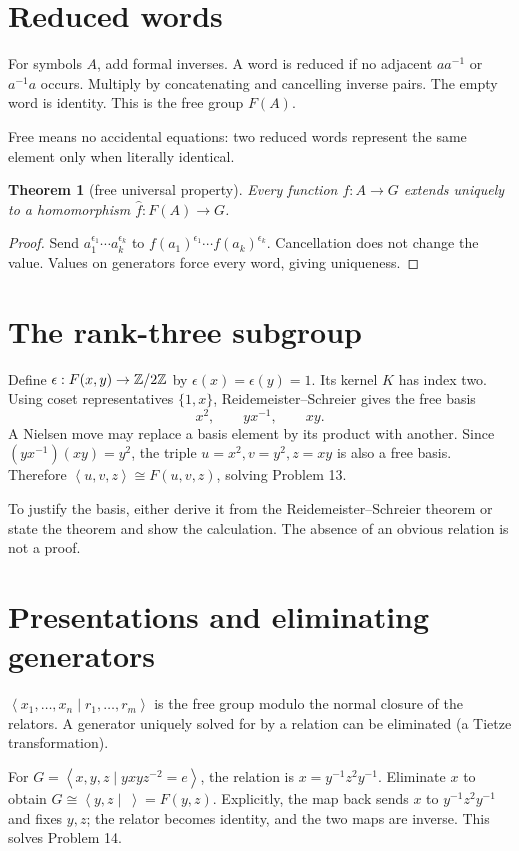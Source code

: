 \documentclass[11pt,openany]{book}
\newcommand{\angles}[1]{\left\langle#1\right\rangle}
\newtheorem{theorem}{Theorem}[chapter]
\theoremstyle{definition}
\begin{document}
\section{Reduced words}
For symbols $A$, add formal inverses. A word is reduced if no adjacent $aa^{-1}$ or $a^{-1}a$ occurs. Multiply by concatenating and cancelling inverse pairs. The empty word is identity. This is the free group $F(A)$.
\begin{intuition}Free means no accidental equations: two reduced words represent the same element only when literally identical.\end{intuition}
\begin{theorem}[free universal property]Every function $f:A\to G$ extends uniquely to a homomorphism $\widehat f:F(A)\to G$.\end{theorem}
\begin{proof}Send $a_1^{\epsilon_1}\cdots a_k^{\epsilon_k}$ to $f(a_1)^{\epsilon_1}\cdots f(a_k)^{\epsilon_k}$. Cancellation does not change the value. Values on generators force every word, giving uniqueness.\end{proof}

\section{The rank-three subgroup}
Define $\epsilon:F(x,y)\to\mathbb Z/2\mathbb Z$ by $\epsilon(x)=\epsilon(y)=1$. Its kernel $K$ has index two. Using coset representatives $\{1,x\}$, Reidemeister--Schreier gives the free basis
\[
x^2,\qquad yx^{-1},\qquad xy.
\]
A Nielsen move may replace a basis element by its product with another. Since $(yx^{-1})(xy)=y^2$, the triple
$u=x^2,v=y^2,z=xy$ is also a free basis. Therefore $\angles{u,v,z}\cong F(u,v,z)$, solving Problem 13.

To justify the basis, either derive it from the Reidemeister--Schreier theorem or state the theorem and show the calculation. The absence of an obvious relation is not a proof.

\section{Presentations and eliminating generators}
$\angles{x_1,\ldots,x_n\mid r_1,\ldots,r_m}$ is the free group modulo the normal closure of the relators. A generator uniquely solved for by a relation can be eliminated (a Tietze transformation).

For $G=\angles{x,y,z\mid yxyz^{-2}=e}$, the relation is $x=y^{-1}z^2y^{-1}$. Eliminate $x$ to obtain
$G\cong\angles{y,z\mid\ }=F(y,z)$. Explicitly, the map back sends $x$ to $y^{-1}z^2y^{-1}$ and fixes $y,z$; the relator becomes identity, and the two maps are inverse. This solves Problem 14.
\end{document}
